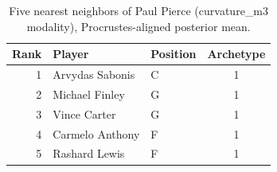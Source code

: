 \begin{table}[htbp]
  \centering\small
  \begin{tabular}{rllc}
    \toprule
    Rank & Player & Position & Archetype \\
    \midrule
    1 & Arvydas Sabonis & C & 1 \\
    2 & Michael Finley & G & 1 \\
    3 & Vince Carter & G & 1 \\
    4 & Carmelo Anthony & F & 1 \\
    5 & Rashard Lewis & F & 1 \\
    \bottomrule
  \end{tabular}
  \caption{Five nearest neighbors of Paul Pierce (curvature_m3 modality), Procrustes-aligned posterior mean.}
  \label{tab:Paul_Pierce_neighbors_curvature_m3}
\end{table}

